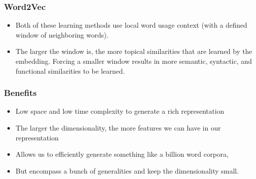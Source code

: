 \begin{frame}[fragile]\frametitle{Word2Vec}
  \begin{itemize}
    \item Both of these learning methods use local word usage context (with a defined window of neighboring words). 
	\item The larger the window is, the more topical similarities that are learned by the embedding. Forcing a smaller window results in more semantic, syntactic, and functional similarities to be learned.
  \end{itemize}

\end{frame}

\begin{frame}[fragile]\frametitle{Benefits}
  \begin{itemize}
    \item Low space and low time complexity to generate a rich representation
	\item The larger the dimensionality, the more features we can have in our representation
	\item Allows us to efficiently generate something like a billion word corpora, 
	\item But encompass a bunch of generalities and keep the dimensionality small.
  \end{itemize}

\end{frame}





